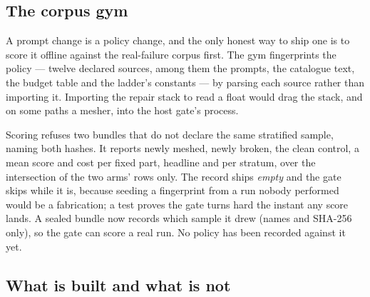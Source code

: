 \documentclass[10pt,onecolumn]{article}
\begin{document}
\subsection{The corpus gym}\label{sec:gym}

A prompt change is a policy change, and the only honest way to ship one is to score it offline
against the real-failure corpus first. The gym fingerprints the policy --- twelve declared sources,
among them the prompts, the catalogue text, the budget table and the ladder's constants --- by
parsing each source rather than importing it. Importing the repair stack to read a float would drag
the stack, and on some paths a mesher, into the host gate's process.

Scoring refuses two bundles that do not declare the same stratified sample, naming both hashes. It
reports newly meshed, newly broken, the clean control, a mean score and cost per fixed part,
headline and per stratum, over the intersection of the two arms' rows only. The record ships
\emph{empty} and the gate skips while it is, because seeding a fingerprint from a run nobody
performed would be a fabrication; a test proves the gate turns hard the instant any score lands.
A sealed bundle now records which sample it drew (names and SHA-256 only), so the gate can score
a real run. No policy has been recorded against it yet.

\subsection{What is built and what is not}\label{sec:v3status}
\end{document}
